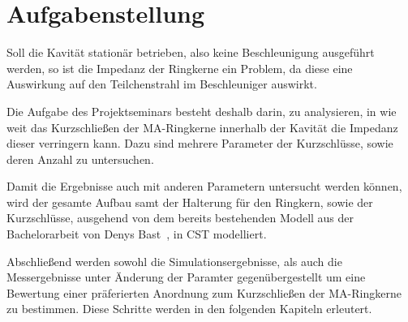 \section{Aufgabenstellung}
Soll die Kavit\"at station\"ar betrieben, also keine Beschleunigung ausgef\"uhrt werden, so ist die Impedanz der Ringkerne ein Problem, da diese eine Auswirkung auf den Teilchenstrahl im Beschleuniger auswirkt.
\par
Die Aufgabe des Projektseminars besteht deshalb darin, zu analysieren, in wie weit das Kurzschlie\ss{}en der MA-Ringkerne innerhalb der Kavit\"at die Impedanz dieser verringern kann. Dazu sind mehrere Parameter der Kurzschl\"usse, sowie deren Anzahl zu untersuchen.
\par
Damit die Ergebnisse auch mit anderen Parametern untersucht werden k\"onnen, wird der gesamte Aufbau samt der Halterung f\"ur den Ringkern, sowie der Kurzschl\"usse, ausgehend von dem bereits bestehenden Modell aus der Bachelorarbeit von Denys Bast~\citep{bast2017ba}, in CST modelliert. 
\par
Abschlie\ss{}end werden sowohl die Simulationsergebnisse, als auch die Messergebnisse unter \"Anderung der Paramter gegen\"ubergestellt um eine Bewertung einer pr\"aferierten Anordnung zum Kurzschlie\ss{}en der MA-Ringkerne zu bestimmen. Diese Schritte werden in den folgenden Kapiteln erleutert. 